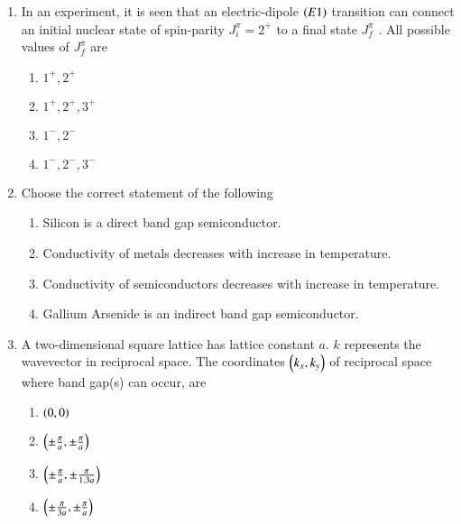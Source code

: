 \documentclass[journal]{IEEEtran}
\begin{document}
\begin{enumerate}[start=14]
    \item In an experiment, it is seen that an electric-dipole $\left(E1\right)$ transition can connect an initial nuclear state of spin-parity $J^{\pi}_i = 2^{+}$ to a final state $J^{\pi}_f$ . All possible values of $J^{\pi}_f$  are
    \begin{enumerate}
        \item $1^{+} , 2^{+}$
        \item $1^{+} , 2^{+} , 3^{+}$
        \item $1^{-} , 2^{-}$
        \item $1^{-} , 2^{-} , 3^{-}$
    \end{enumerate}

    \item Choose the correct statement of the following
    \begin{enumerate}
        \item Silicon is a direct band gap semiconductor.
        \item Conductivity of metals decreases with increase in temperature.
        \item Conductivity of semiconductors decreases with increase in temperature.
        \item Gallium Arsenide is an indirect band gap semiconductor.
    \end{enumerate}

    \item A two-dimensional square lattice has lattice constant $a$. $k$ represents the wavevector in reciprocal space. The coordinates $\left(k_x, k_y\right)$ of reciprocal space where band gap(s) can occur, are
    \begin{enumerate}
        \item $\left(0,0\right)$
        \item $\left(\pm \frac{\pi}{a} , \pm \frac{\pi}{a}\right)$
        \item $\left(\pm \frac{\pi}{a} , \pm \frac{\pi}{1.3a}\right)$
        \item $\left(\pm \frac{\pi}{3a} , \pm \frac{\pi}{a}\right)$
    \end{enumerate}


\end{enumerate}
\end{document}

